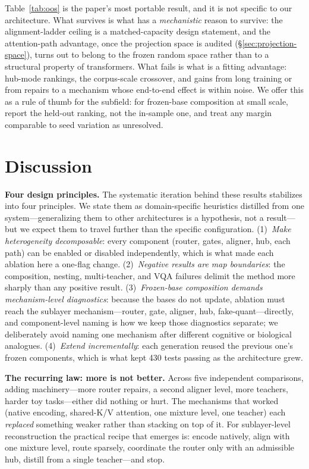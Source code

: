 \documentclass[10pt]{article}
\theoremstyle{definition}
\theoremstyle{plain}
\theoremstyle{remark}
\begin{document}
Table~\ref{tab:oos} is the paper's most portable result, and it is not specific to our architecture. What survives is what has a \emph{mechanistic} reason to survive: the alignment-ladder ceiling is a matched-capacity design statement, and the attention-path advantage, once the projection space is audited (\S\ref{sec:projection-space}), turns out to belong to the frozen random space rather than to a structural property of transformers. What fails is what is a fitting advantage: hub-mode rankings, the corpus-scale crossover, and gains from long training or from repairs to a mechanism whose end-to-end effect is within noise. We offer this as a rule of thumb for the subfield: for frozen-base composition at small scale, report the held-out ranking, not the in-sample one, and treat any margin comparable to seed variation as unresolved.

\section{Discussion}
\label{sec:discussion}

\textbf{Four design principles.} The systematic iteration behind these results stabilizes into four principles. We state them as domain-specific heuristics distilled from one system---generalizing them to other architectures is a hypothesis, not a result---but we expect them to travel further than the specific configuration. (1)~\emph{Make heterogeneity decomposable}: every component (router, gates, aligner, hub, each path) can be enabled or disabled independently, which is what made each ablation here a one-flag change. (2)~\emph{Negative results are map boundaries}: the composition, nesting, multi-teacher, and VQA failures delimit the method more sharply than any positive result. (3)~\emph{Frozen-base composition demands mechanism-level diagnostics}: because the bases do not update, ablation must reach the sublayer mechanism---router, gate, aligner, hub, fake-quant---directly, and component-level naming is how we keep those diagnostics separate; we deliberately avoid naming one mechanism after different cognitive or biological analogues. (4)~\emph{Extend incrementally}: each generation reused the previous one's frozen components, which is what kept 430 tests passing as the architecture grew.

\textbf{The recurring law: more is not better.} Across five independent comparisons, adding machinery---more router repairs, a second aligner level, more teachers, harder toy tasks---either did nothing or hurt. The mechanisms that worked (native encoding, shared-K/V attention, one mixture level, one teacher) each \emph{replaced} something weaker rather than stacking on top of it. For sublayer-level reconstruction the practical recipe that emerges is: encode natively, align with one mixture level, route sparsely, coordinate the router only with an admissible hub, distill from a single teacher---and stop.
\end{document}
